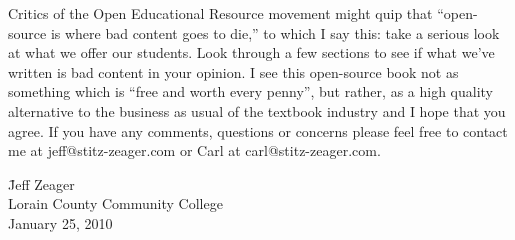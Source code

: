 \documentclass{ximera}
\begin{document}
\pagebreak

\noindent  Critics of the Open Educational Resource movement might quip that ``open-source is where bad content goes to die,'' to which I say this: take a serious look at what we offer our students.  Look through a few sections to see if what we've written is bad content in your opinion.  I see this open-source book not as something which is ``free and worth every penny'', but rather, as a high quality alternative to the business as usual of the textbook industry and I hope that you agree.  If you have any comments, questions or concerns please feel free to contact me at jeff@stitz-zeager.com or Carl at carl@stitz-zeager.com.

\vspace{.5in}

\begin{tabbing}

\hspace{4in}   \= Jeff Zeager \\
               \> Lorain County Community College \\
               \> January 25, 2010
               
\end{tabbing}
\end{document}
